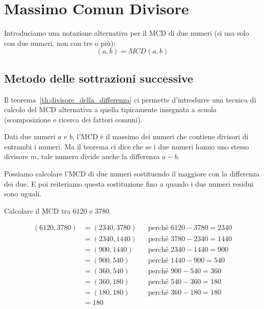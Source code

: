 \chapter{Massimo Comun Divisore}
\label{ch:mcd}

Introduciamo una notazione alternativa per il MCD di due numeri (si usa solo con due numeri, non con tre o più):
\begin{equation*}
    (a, b) = MCD(a, b)
\end{equation*}

\section{Metodo delle sottrazioni successive}
\label{sec:metodo_sottrazioni_successive}

Il teorema~\ref{th:divisore_della_differenza} ci permette d'introdurre una tecnica di calcolo del MCD alternativa a quella tipicamente insegnata a scuola (scomposizione e ricerca dei fattori comuni).

Dati due numeri $a$ e $b$, l'MCD è il massimo dei numeri che contiene divisori di entrambi i numeri.
Ma il teorema ci dice che se i due numeri hanno uno stesso divisore $m$, tale numero divide anche la differenza $a - b$.

\begin{definizione}

Possiamo calcolare l'MCD di due numeri sostituendo il maggiore con la differenza dei due.
E poi reiteriamo questa sostituzione fino a quando i due numeri residui sono uguali.

\end{definizione}

\begin{esercizio}
    Calcolare il MCD tra 6120 e 3780.

    \begin{align*}
        (6120, 3780) &= (2340, 3780) &&\text{perché } 6120 - 3780 = 2340 \\
        &= (2340, 1440) &&\text{perché } 3780 - 2340 = 1440 \\
        &= (900, 1440) &&\text{perché } 2340 - 1440 = 900 \\
        &= (900, 540) &&\text{perché } 1440 - 900 = 540 \\
        &= (360, 540) &&\text{perché } 900 - 540 = 360 \\
        &= (360, 180) &&\text{perché } 540 - 360 = 180 \\
        &= (180, 180) &&\text{perché } 360 - 180 = 180 \\
        &= 180
    \end{align*}
\end{esercizio}


